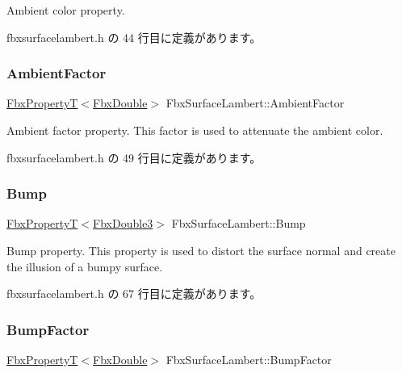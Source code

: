 Ambient color property. 



 fbxsurfacelambert.\+h の 44 行目に定義があります。

\mbox{\label{class_fbx_surface_lambert_ad23d8852b1b3ef57e73b60d43728b67c}} 
\subsubsection{\texorpdfstring{Ambient\+Factor}{AmbientFactor}}
{\footnotesize\ttfamily \hyperlink{class_fbx_property_t}{Fbx\+PropertyT}$<$\hyperlink{fbxtypes_8h_a171e72a1c46fc15c1a6c9c31948c1c5b}{Fbx\+Double}$>$ Fbx\+Surface\+Lambert\+::\+Ambient\+Factor}

Ambient factor property. This factor is used to attenuate the ambient color. 

 fbxsurfacelambert.\+h の 49 行目に定義があります。

\mbox{\label{class_fbx_surface_lambert_a1efc60f9887c83c861e4c428c4b6fb8d}} 
\subsubsection{\texorpdfstring{Bump}{Bump}}
{\footnotesize\ttfamily \hyperlink{class_fbx_property_t}{Fbx\+PropertyT}$<$\hyperlink{fbxtypes_8h_ae0a96f14cde566774c7553aa7523b7a7}{Fbx\+Double3}$>$ Fbx\+Surface\+Lambert\+::\+Bump}

Bump property. This property is used to distort the surface normal and create the illusion of a bumpy surface. 

 fbxsurfacelambert.\+h の 67 行目に定義があります。

\mbox{\label{class_fbx_surface_lambert_a23af5e6809344bdf94212955b1a3ed53}} 
\subsubsection{\texorpdfstring{Bump\+Factor}{BumpFactor}}
{\footnotesize\ttfamily \hyperlink{class_fbx_property_t}{Fbx\+PropertyT}$<$\hyperlink{fbxtypes_8h_a171e72a1c46fc15c1a6c9c31948c1c5b}{Fbx\+Double}$>$ Fbx\+Surface\+Lambert\+::\+Bump\+Factor}

